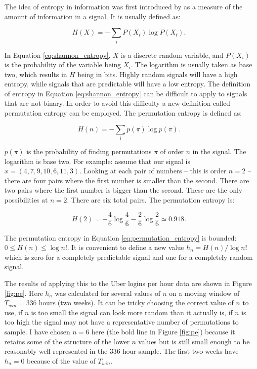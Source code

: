 \documentclass{tufte-handout}
\begin{document}
The idea of entropy in information was first introduced by \citet{Shannon48} as a measure of the amount of information in a signal. It is usually defined as:

\begin{equation}
        H(X) = - \sum_i P(X_i) \log P(X_i)
        \label{eq:shannon_entropy}.
\end{equation}

\noindent In Equation \ref{eq:shannon_entropy}, $X$ is a discrete random variable, and $P(X_i)$ is the probability of the variable being $X_i$. The logarithm is usually taken as base two, which results in $H$ being in bits. Highly random signals will have a high entropy, while signals that are predictable will have a low entropy. The definition of entropy in Equation \ref{eq:shannon_entropy} can be difficult to apply to signals that are not binary. In order to avoid this difficulty a new definition called permutation entropy \citep{BrandtP02} can be employed. The permutation entropy is defined as:

\begin{equation}
        H(n) = - \sum_i p(\pi) \log p(\pi)
        \label{eq:permutation_entropy}.
\end{equation}

\noindent $p(\pi)$ is the probability of finding permutations $\pi$ of order $n$ in the signal. The logarithm is base two. For example: assume that our signal is $x = (4,7,9,10,6,11,3)$. Looking at each pair of numbers -- this is order $n = 2$ -- there are four pairs where the first number is smaller than the second. There are two pairs where the first number is bigger than the second. These are the only possibilities at $n = 2$. There are six total pairs. The permutation entropy is:

\begin{equation}
        H(2) = - \frac{4}{6} \log \frac{4}{6} - \frac{2}{6} \log \frac{2}{6} \simeq 0.918
        \label{eq:permutation_entropy_eg}.
\end{equation}

\noindent The permutation entropy in Equation \ref{eq:permutation_entropy} is bounded: $0 \leq H(n) \leq \log n!$. It is convenient to define a new value $h_n = H(n)/\log n! $ which is zero for a completely predictable signal and one for a completely random signal.

The results of applying this to the Uber logins per hour data are shown in Figure \ref{fig:pe}. Here $h_n$ was calculated for several values of $n$ on a moving window of $T_{win} = 336$ hours (two weeks). It can be tricky choosing the correct value of $n$ to use, if $n$ is too small the signal can look more random than it actually is, if $n$ is too high the signal may not have a representative number of permutations to sample. I have chosen $n = 6$ here (the bold line in Figure \ref{fig:pe}) because it retains some of the structure of the lower $n$ values but is still small enough to be reasonably well represented in the 336 hour sample. The first two weeks have $h_n = 0$ because of the value of $T_{win}$.
\end{document}
